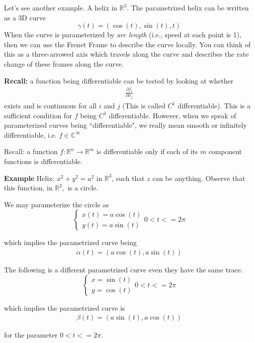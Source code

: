 \documentclass{article}
\begin{document}
Let's see another example. A helix in $\mathbb{R}^3$.
The parametrized helix can be written as a 3D curve 
\[
\gamma(t) = (\cos(t), \sin(t), t)
\]
When the curve is parameterized by \textit{arc length} (i.e., speed at each point is 1), then we can use the Frenet Frame to describe the curve locally. You can think of this as a three-arrowed axis which travels along the curve and describes the rate change of these frames along the curve. 

\textbf{Recall:} a function being differentiable can be tested by looking at whether
\begin{align*}
    \frac{\partial f_i}{\partial{x_j}}
\end{align*}
exists and is continuous for all $i$ and $j$ (This is called $C^1$ differentiable). This is  a sufficient condition for $f$ being $C^1$ differentiable. However, when we speak of parameterized curves being ``differentiable", we really mean smooth or infinitely differentiable, i.e. $f \in \mathbb{C}^\infty$

Recall: a function $f \colon \mathbb{R}^n \to \mathbb{R}^m$ is differentiable only if each of its $m$ component functions is differentiable.

\textbf{Example} Helix:
$x^2 + y^2 = a^2$ in $\mathbb{R}^3$, such that $z$ can be anything. Observe that this function, in $\mathbb{R}^2,$ is a circle. 

We may parameterize the circle as 
\[
\begin{cases}
        x(t) = a\cos(t) \\
        y(t) = a\sin(t)  
\end{cases}
0 < t <= 2\pi 
\]

which implies the parametrized curve being
\begin{align*}
    \alpha(t) = (a \cos(t), a \sin(t))
\end{align*}

The following is a different parametrized curve even they have the same trace. 
\[
\begin{cases}
        x = \sin(t) \\
        y = \cos(t)  
\end{cases}
0 < t <= 2\pi 
\]

which implies the parametrized curve is
\begin{align*}
    \beta(t) = (a \sin(t), a \cos(t))
\end{align*}

for the parameter 
$0 < t <= 2\pi.$
\end{document}
